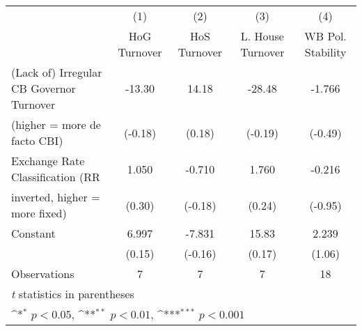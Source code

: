 \begin{table}[htbp]\centering
\def\sym#1{\ifmmode^{#1}\else\(^{#1}\)\fi}
\caption{\label{lowKIfivs4}}
\begin{tabular}{l*{4}{c}}
\toprule
                                        &\multicolumn{1}{c}{(1)}&\multicolumn{1}{c}{(2)}&\multicolumn{1}{c}{(3)}&\multicolumn{1}{c}{(4)}\\
                                        &\multicolumn{1}{c}{HoG Turnover}&\multicolumn{1}{c}{HoS Turnover}&\multicolumn{1}{c}{L. House Turnover}&\multicolumn{1}{c}{WB Pol. Stability}\\
\midrule
(Lack of) Irregular CB Governor Turnover&   -13.30         &    14.18         &   -28.48         &   -1.766         \\
(higher = more de facto CBI)            &  (-0.18)         &   (0.18)         &  (-0.19)         &  (-0.49)         \\
\addlinespace
Exchange Rate Classification (RR        &    1.050         &   -0.710         &    1.760         &   -0.216         \\
inverted, higher = more fixed)          &   (0.30)         &  (-0.18)         &   (0.24)         &  (-0.95)         \\
\addlinespace
Constant                                &    6.997         &   -7.831         &    15.83         &    2.239         \\
                                        &   (0.15)         &  (-0.16)         &   (0.17)         &   (1.06)         \\
\midrule
Observations                            &        7         &        7         &        7         &       18         \\
\bottomrule
\multicolumn{5}{l}{\footnotesize \textit{t} statistics in parentheses}\\
\multicolumn{5}{l}{\footnotesize \sym{*} \(p<0.05\), \sym{**} \(p<0.01\), \sym{***} \(p<0.001\)}\\
\end{tabular}
\end{table}
